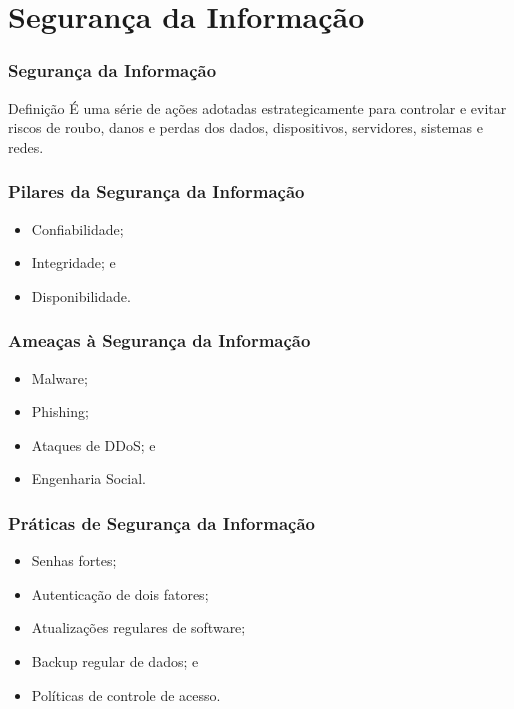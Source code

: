 \documentclass[aspectratio=169]{beamer} %
\begin{document}
\section{Segurança da Informação}

\begin{frame}
	\frametitle{Segurança da Informação}
	
	\begin{block}{Definição}
		 É uma série de ações adotadas estrategicamente para controlar e evitar riscos de roubo, danos e perdas dos dados, dispositivos, servidores, sistemas e redes.
	\end{block}
\end{frame}

\begin{frame}
	\frametitle{Pilares da Segurança da Informação}

	\begin{itemize}
		\item Confiabilidade;
		\item Integridade; e
		\item Disponibilidade.
	\end{itemize}
\end{frame}

\begin{frame}
	\frametitle{Ameaças à Segurança da Informação}
	
	\begin{itemize}
		\item Malware;
		\item Phishing;
		\item Ataques de DDoS; e
		\item Engenharia Social.
	\end{itemize}
\end{frame}

\begin{frame}
	\frametitle{Práticas de Segurança da Informação}
	
	\begin{itemize}
		\item Senhas fortes;
		\item Autenticação de dois fatores;
		\item Atualizações regulares de software;
		\item Backup regular de dados; e
		\item Políticas de controle de acesso.
	\end{itemize}
\end{frame}
\end{document}

